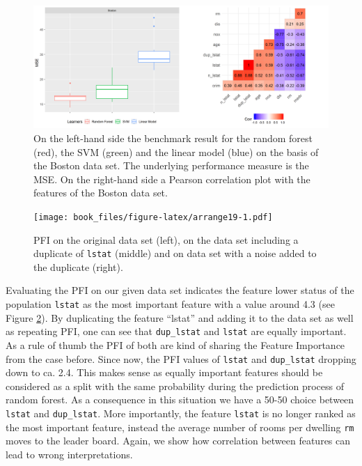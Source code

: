 \documentclass[]{krantz}
\begin{document}
\begin{figure}
\includegraphics[width=1\linewidth]{images/bmreal} \caption{On the left-hand side the benchmark result for the random forest (red), the SVM (green) and the linear model (blue) on the basis of the Boston data set. The underlying performance measure is the MSE. On the right-hand side a Pearson correlation plot with the features of the Boston data set.}\label{fig:bmrBoston}
\end{figure}

\begin{figure}
\centering
\texttt{[image: book\_files/figure-latex/arrange19-1.pdf]}
\caption{\label{fig:arrange19}PFI on the original data set (left), on the
data set including a duplicate of \texttt{lstat} (middle) and on data
set with a noise added to the duplicate (right).}
\end{figure}

Evaluating the PFI on our given data set indicates the feature lower
status of the population \texttt{lstat} as the most important feature
with a value around 4.3 (see Figure \ref{fig:arrange19}). By duplicating
the feature ``lstat'' and adding it to the data set as well as repeating
PFI, one can see that \texttt{dup\_lstat} and \texttt{lstat} are equally
important. As a rule of thumb the PFI of both are kind of sharing the
Feature Importance from the case before. Since now, the PFI values of
\texttt{lstat} and \texttt{dup\_lstat} dropping down to ca. 2.4. This
makes sense as equally important features should be considered as a
split with the same probability during the prediction process of random
forest. As a consequence in this situation we have a 50-50 choice
between \texttt{lstat} and \texttt{dup\_lstat}. More importantly, the
feature \texttt{lstat} is no longer ranked as the most important
feature, instead the average number of rooms per dwelling \texttt{rm}
moves to the leader board. Again, we show how correlation between
features can lead to wrong interpretations.
\end{document}
